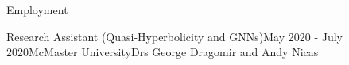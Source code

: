\begin{rSection}{Employment}

\begin{rSubsection}{Research Assistant (Quasi-Hyperbolicity and GNNs)}{May 2020 - July 2020}{McMaster University}{Drs George Dragomir and Andy Nicas}
\end{rSubsection}




\end{rSection}
